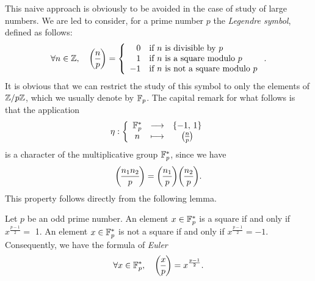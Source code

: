  
  This naive approach is obviously to be avoided in the case of study of large numbers. We are led to consider, for a prime number $ p $ the \textit{Legendre symbol}, defined as follows: \label{notation-25}
\begin{equation*}
\forall n \in \ZZ, \quad \legsymb{n}{p} = \left\{\begin{array}{rl} 0 & \text{if
} n \text{ is divisible by } p \\1 & \text{if } n \text{ is a square modulo } p \\-1
				   & \text{if } n \text{ is not a square modulo } p \end{array} \right. .
\end{equation*}
It is obvious that we can restrict the study of this symbol to only the elements of $ \mathbb{Z}/p \mathbb{Z} $, which we usually denote by $ \mathbb{F}_p $. The capital remark for what follows is that the application
\begin{equation}
\label{eq-defn-cartactere-eta}
\eta: \func{\FF_p^*}{\{- 1, \, 1\}}{n}{\legsymb{n}{p}}
\end{equation}
is a character of the multiplicative group $ \mathbb{F}_p^* $, since we have
\begin{equation*}
\legsymb{n_1 n_2}{p} = \legsymb{n_1}{p} \legsymb{n_2}{p}.
\end{equation*}
This property follows directly from the following lemma.
 
\begin{lem}
\label{lem-formula-euler}
  Let $ p $ be an odd prime number. An element $ x \in \mathbb{F}_p^* $ is a square if and only if $ x^{\frac{p-1}{2}} = $ 1. An element $ x \in \mathbb{F}_p^* $ is not a square if and only if $ x^{\frac{p-1}{2}} = -1 $. Consequently, we have the formula of \textit{Euler}
\begin{equation*}
\forall x \in \FF_p^*, \quad \legsymb{x}{p} = x^{\frac{p-1}{2}}.
\end{equation*}
\end{lem}
 

